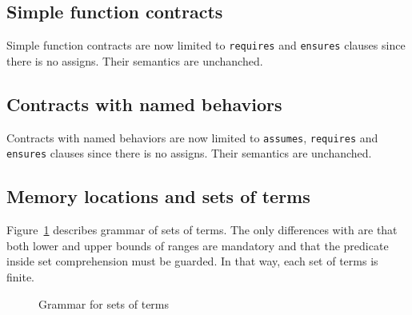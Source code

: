 
\subsection{Simple function contracts}
\label{sec:simplecontracts}


Simple function contracts are now limited to \lstinline|requires| and
\lstinline|ensures| clauses since there is no assigns. Their semantics are
unchanched.


\subsection{Contracts with named behaviors}
\label{subsec:behaviors}


Contracts with named behaviors are now limited to \lstinline|assumes|,
\lstinline|requires| and \lstinline|ensures| clauses since there is no
assigns. Their semantics are unchanched.


\subsection{Memory locations and sets of terms}
\label{sec:locations}


Figure~\ref{fig:gram:locations} describes grammar of sets of terms. The only
differences with \acsl are that both lower and upper bounds of ranges are
mandatory and that the predicate inside set comprehension must be guarded. In
that way, each set of terms is finite.
\begin{figure}[htbp]
  \caption{Grammar for sets of terms}
\label{fig:gram:locations}
\end{figure}



